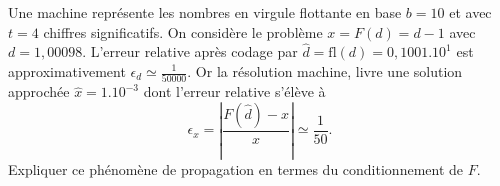 
\begin{exercice}\label{exoSerieQuatre0005}

Une machine représente les nombres en virgule flottante en base $b=10$ et avec $t=4$ chiffres significatifs. On considère le problème $x=F(d)=d-1$ avec $d=1,00098$. L'erreur relative après codage par $\hat{d}=\mbox{fl}(d)=0,1001.10^1$ est approximativement $\epsilon_d\simeq\frac{1}{50000}$. Or la résolution machine, livre une solution approchée $\hat{x}=1.10^{-3}$ dont l'erreur relative s'élève à 
\begin{equation}
	\epsilon_x=\left|\frac{F(\hat{d})-x}{x}\right|\simeq\frac{1}{50}.
\end{equation}
Expliquer ce phénomène de propagation en termes du conditionnement de $F$.

\end{exercice}
